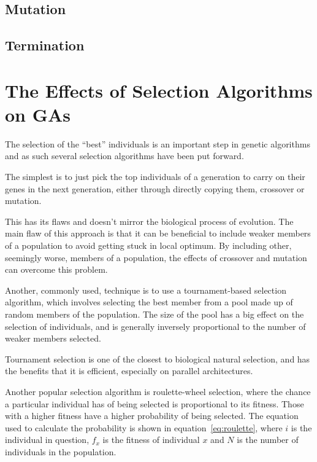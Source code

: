 \documentclass[10pt, a4paper]{article}
\begin{document}
\subsection{Mutation}

\subsection{Termination}


\newpage
\section{The Effects of Selection Algorithms on GAs}
\label{sec:selection-algorithms}

The selection of the ``best'' individuals is an important step in genetic
algorithms and as such several selection algorithms have been put forward.

The simplest is to just pick the top individuals of a generation to carry on
their genes in the next generation, either through directly copying them, 
crossover or mutation.

This has its flaws and doesn't mirror the biological process of evolution. The
main flaw of this approach is that it can be beneficial to include weaker 
members of a population to avoid getting stuck in local optimum. By including
other, seemingly worse, members of a population, the effects of crossover and
mutation can overcome this problem.

Another, commonly used, technique is to use a tournament-based selection 
algorithm, which involves selecting the best member from a pool made up of
random members of the population. The size of the pool has a big effect on the
selection of individuals, and is generally inversely proportional to the
number of weaker members selected.

Tournament selection is one of the closest to biological natural selection,
and has the benefits that it is efficient, especially on parallel 
architectures.

Another popular selection algorithm is roulette-wheel selection, where the
chance a particular individual has of being selected is proportional to its
fitness. Those with a higher fitness have a higher probability of being 
selected. The equation used to calculate the probability is shown in 
equation~\ref{eq:roulette}, where $i$ is the individual in question, $f_x$ is
the fitness of individual $x$ and $N$ is the number of individuals in the 
population.
\end{document}
